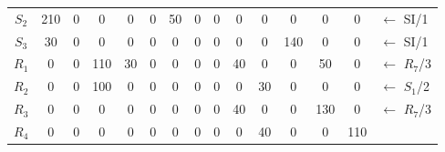 \documentclass[12pt]{article}
\begin{document}
\begin{enumerate}
\begin{tabular}{|c|c|c|c|c|c|c|c|c|c|c|c|c|c|l}
$S_2$ & 210 & {\color[HTML]{000000} 0}        & {\color[HTML]{000000} 0}        & {\color[HTML]{000000} 0}        & {\color[HTML]{000000} 0}   & {\color[HTML]{000000} 50}  & {\color[HTML]{000000} 0}   & {\color[HTML]{000000} 0}  & {\color[HTML]{000000} 0}   & {\color[HTML]{000000} 0}  & {\color[HTML]{000000} 0}   & {\color[HTML]{000000} 0}   & {\color[HTML]{000000} 0}   & ${\leftarrow}$ SI/1    \\ \cline{1-14}
$S_3$ & 30  & {\color[HTML]{000000} 0}        & {\color[HTML]{000000} 0}        & {\color[HTML]{000000} 0}        & {\color[HTML]{000000} 0}   & {\color[HTML]{000000} 0}   & {\color[HTML]{000000} 0}   & {\color[HTML]{000000} 0}  & {\color[HTML]{000000} 0}   & {\color[HTML]{000000} 0}  & {\color[HTML]{FE0000} 140} & {\color[HTML]{000000} 0}   & {\color[HTML]{000000} 0}   & ${\leftarrow}$ SI/1    \\ \cline{1-14}
$R_1$ & 0   & {\color[HTML]{000000} 0}        & {\color[HTML]{000000} 110}      & {\color[HTML]{000000} 30}       & {\color[HTML]{000000} 0}   & {\color[HTML]{000000} 0}   & {\color[HTML]{000000} 0}   & {\color[HTML]{000000} 0}  & {\color[HTML]{000000} 40}  & {\color[HTML]{000000} 0}  & {\color[HTML]{000000} 0}   & {\color[HTML]{000000} 50}  & {\color[HTML]{000000} 0}   &    ${\leftarrow}$ $R_7$/3                    \\ \cline{1-14}
$R_2$ & 0   & {\color[HTML]{000000} 0}        & {\color[HTML]{000000} 100}      & {\color[HTML]{000000} 0}        & {\color[HTML]{000000} 0}   & {\color[HTML]{000000} 0}   & {\color[HTML]{000000} 0}   & {\color[HTML]{000000} 0}  & {\color[HTML]{000000} 0}   & {\color[HTML]{000000} 30} & {\color[HTML]{000000} 0}   & {\color[HTML]{000000} 0}   & {\color[HTML]{000000} 0}   & ${\leftarrow}$ $S_1$/2 \\ \cline{1-14}
$R_3$ & 0   & {\color[HTML]{000000} 0}        & {\color[HTML]{000000} 0}        & {\color[HTML]{000000} 0}        & {\color[HTML]{000000} 0}   & {\color[HTML]{000000} 0}   & {\color[HTML]{000000} 0}   & {\color[HTML]{000000} 0}  & {\color[HTML]{FE0000} 40}  & {\color[HTML]{000000} 0}  & {\color[HTML]{000000} 0}   & {\color[HTML]{000000} 130} & {\color[HTML]{000000} 0}   & ${\leftarrow}$ $R_7$/3 \\ \cline{1-14}
$R_4$ & 0   & {\color[HTML]{000000} 0}        & {\color[HTML]{000000} 0}        & {\color[HTML]{000000} 0}        & {\color[HTML]{000000} 0}   & {\color[HTML]{000000} 0}   & {\color[HTML]{000000} 0}   & {\color[HTML]{000000} 0}  & {\color[HTML]{000000} 0}   & {\color[HTML]{000000} 40} & {\color[HTML]{000000} 0}   & {\color[HTML]{000000} 0}   & {\color[HTML]{000000} 110} &                        \\ \cline{1-14}

\end{tabular}
\end{enumerate}
\end{document}
